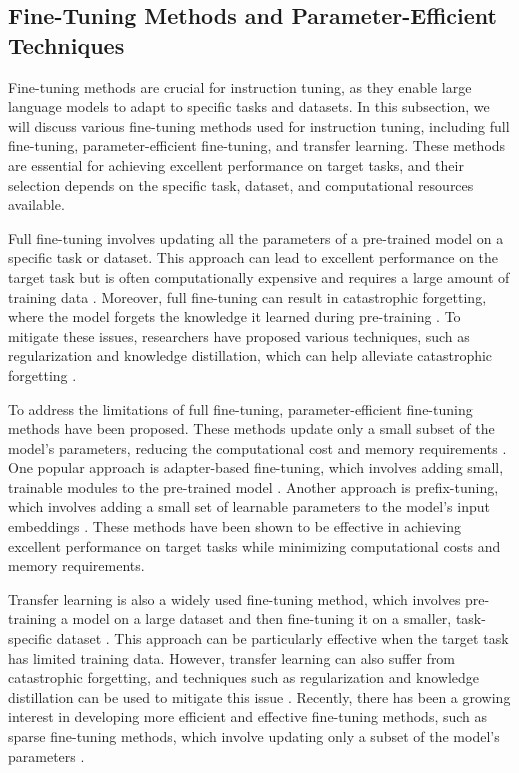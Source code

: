 \documentclass[11pt]{article}
\begin{document}
\subsection{Fine-Tuning Methods and Parameter-Efficient Techniques}

Fine-tuning methods are crucial for instruction tuning, as they enable large language models to adapt to specific tasks and datasets. In this subsection, we will discuss various fine-tuning methods used for instruction tuning, including full fine-tuning, parameter-efficient fine-tuning, and transfer learning. These methods are essential for achieving excellent performance on target tasks, and their selection depends on the specific task, dataset, and computational resources available.

Full fine-tuning involves updating all the parameters of a pre-trained model on a specific task or dataset. This approach can lead to excellent performance on the target task but is often computationally expensive and requires a large amount of training data \cite{ref50}. Moreover, full fine-tuning can result in catastrophic forgetting, where the model forgets the knowledge it learned during pre-training \cite{ref51}. To mitigate these issues, researchers have proposed various techniques, such as regularization and knowledge distillation, which can help alleviate catastrophic forgetting \cite{ref52}.

To address the limitations of full fine-tuning, parameter-efficient fine-tuning methods have been proposed. These methods update only a small subset of the model's parameters, reducing the computational cost and memory requirements \cite{ref53}. One popular approach is adapter-based fine-tuning, which involves adding small, trainable modules to the pre-trained model \cite{ref54}. Another approach is prefix-tuning, which involves adding a small set of learnable parameters to the model's input embeddings \cite{ref55}. These methods have been shown to be effective in achieving excellent performance on target tasks while minimizing computational costs and memory requirements.

Transfer learning is also a widely used fine-tuning method, which involves pre-training a model on a large dataset and then fine-tuning it on a smaller, task-specific dataset \cite{ref56}. This approach can be particularly effective when the target task has limited training data. However, transfer learning can also suffer from catastrophic forgetting, and techniques such as regularization and knowledge distillation can be used to mitigate this issue \cite{ref52}. Recently, there has been a growing interest in developing more efficient and effective fine-tuning methods, such as sparse fine-tuning methods, which involve updating only a subset of the model's parameters \cite{ref57}.
\end{document}
